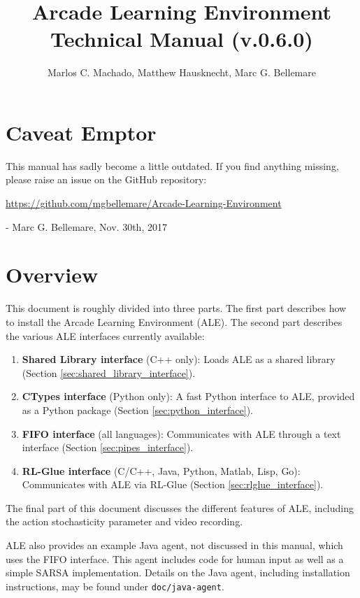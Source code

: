 \documentclass[12pt]{article}
\title{Arcade Learning Environment\\ Technical Manual (v.0.6.0)}
\author{Marlos C. Machado, Matthew Hausknecht, Marc G. Bellemare}
\begin{document}
\maketitle

\clearpage

\tableofcontents

\clearpage
\setcounter{section}{-1}

\section{Caveat Emptor}

This manual has sadly become a little outdated. If you find anything missing, please raise an issue on the GitHub repository:


\url{https://github.com/mgbellemare/Arcade-Learning-Environment}

\begin{flushright}- Marc G. Bellemare, Nov. 30th, 2017\end{flushright}

\section{Overview}

This document is roughly divided into three parts. The first part describes how to install the Arcade Learning Environment (ALE). The second part describes the various ALE interfaces currently available: 
\begin{enumerate}
  \item \textbf{Shared Library interface} (C++ only): Loads ALE as a shared library (Section 
  \ref{sec:shared_library_interface}).
  \item \textbf{CTypes interface} (Python only): A fast Python interface to ALE, provided as a Python package (Section \ref{sec:python_interface}).
  \item \textbf{FIFO interface} (all languages): Communicates with ALE through a text interface (Section \ref{sec:pipes_interface}).
  \item \textbf{RL-Glue interface} (C/C++, Java, Python, Matlab, Lisp, Go): Communicates with ALE via RL-Glue (Section \ref{sec:rlglue_interface}).
\end{enumerate}
The final part of this document discusses the different features of ALE, including the action stochasticity parameter and video recording.

ALE also provides an example Java agent, not discussed in this manual, which uses the FIFO interface. This agent includes code for human input as well as a simple SARSA implementation. Details on the Java agent, including installation instructions, may be found under \verb+doc/java-agent+.
\end{document}
